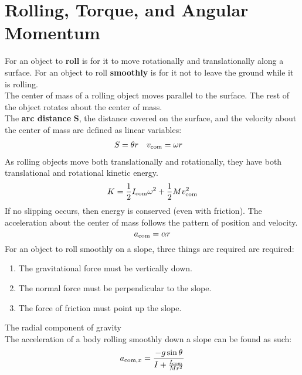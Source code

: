 \documentclass[../AP_Physics_C.tex]{subfiles}
\begin{document}
	\section{Rolling, Torque, and Angular Momentum}
		For an object to \textbf{roll} is for it to move rotationally and translationally along a surface. For an object to roll \textbf{smoothly} is for it not to leave the ground while it is rolling. \\
		The center of mass of a rolling object moves parallel to the surface. The rest of the object rotates about the center of mass. \\
		The \textbf{arc distance} $\pmb{S}$, the distance covered on the surface, and the velocity about the center of mass are defined as linear variables:
		\begin{align*}
			S &= \theta r & v_{\mathrm{com}} &= \omega r
		\end{align*}
		As rolling objects move both translationally and rotationally, they have both translational and rotational kinetic energy.
		\[K = \frac{1}{2}I_{\mathrm{com}}\omega^2 + \frac{1}{2}Mv_{\mathrm{com}}^2\]
		If no slipping occurs, then energy is conserved (even with friction).
		The acceleration about the center of mass follows the pattern of position and velocity.
		\[a_{\mathrm{com}} = \alpha r\]
		For an object to roll smoothly on a slope, three things are required are required:
		\begin{enumerate}
			\item
				The gravitational force must be vertically down.
			\item
				The normal force must be perpendicular to the slope.
			\item
				The force of friction must point up the slope.
		\end{enumerate}
		\begin{center}
		\end{center}
		The radial component of gravity \\
		The acceleration of a body rolling smoothly down a slope can be found as such:
		\[a_{\mathrm{com},x} = \frac{-g\sin\theta}{I + \frac{I_{\mathrm{com}}}{Mr^2}}\]
\end{document}
